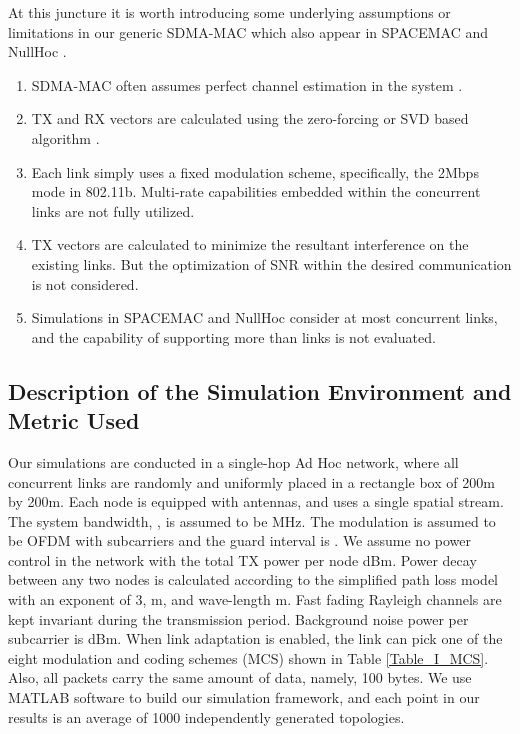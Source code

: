\documentclass[journal, final]{IEEEtran}
\begin{document}
At this juncture it is worth introducing some underlying assumptions or
limitations in our generic SDMA-MAC which also appear in SPACEMAC \cite{1_SPACEMAC, 2_MIMOMAN} and
NullHoc \cite{3_NULLHOC, 4_nullhoc}.
\begin{enumerate}
\item SDMA-MAC often assumes perfect channel estimation in the system \cite{1_SPACEMAC, 2_MIMOMAN}.
\item TX and RX vectors are calculated using the zero-forcing or SVD
based algorithm \cite{1_SPACEMAC, 2_MIMOMAN, 3_NULLHOC, 4_nullhoc}.
\item Each link simply uses a fixed modulation scheme, specifically,
the 2Mbps mode in 802.11b. Multi-rate capabilities embedded within the concurrent links are not fully
utilized.
\item TX vectors are calculated to minimize the resultant interference on the
existing links. But the optimization of SNR within the desired
communication is not considered.
\item Simulations in SPACEMAC and NullHoc consider at most  concurrent
links, and the capability of supporting more than  links is not
evaluated.
\end{enumerate}

\subsection{Description of the Simulation Environment and Metric Used}

Our simulations are conducted in a single-hop Ad Hoc network, where all
concurrent links are randomly and uniformly placed in a rectangle box of
200m by 200m. Each node is equipped with  antennas, and uses a
single spatial stream. The system bandwidth, , is assumed to be MHz. The modulation is assumed to be OFDM with 
subcarriers and the guard interval is . We assume no power
control in the network with the total TX power per node dBm. Power decay between any two nodes is calculated according to
the simplified path loss model \cite{6_Wireless_Comm_David} with an exponent of 3,
m, and wave-length m. Fast fading Rayleigh
channels are kept invariant during the transmission period. Background noise power per
subcarrier is dBm. When link adaptation is
enabled, the link can pick one of the eight modulation and coding schemes
(MCS) shown in Table \ref{Table_I_MCS}. Also, all packets carry the same
amount of data, namely, 100 bytes. We use MATLAB software to build our simulation framework, and each point in our results is an average of 1000 independently generated topologies.
\end{document}
